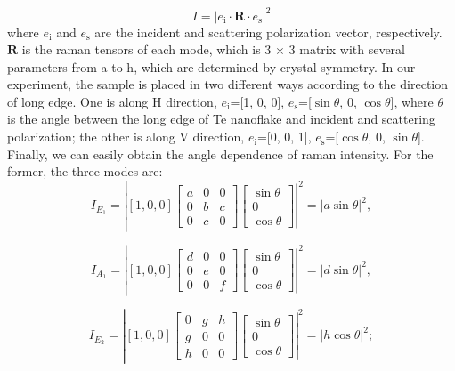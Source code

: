 \documentclass[journal=jacsat,manuscript=article]{achemso}
\begin{document}
\begin{equation}
I = \left|e_{\mathrm{i}} \cdot \mathbf{R} \cdot e_{\mathrm{s}}\right|^{2}
\end{equation}
where $e_{\mathrm{i}}$ and $e_{\mathrm{s}}$ are the incident and scattering polarization vector, respectively. $\mathbf{R}$ is the raman tensors of each mode\cite{tong2020stable}, which is 3 $\times$ 3 matrix with several parameters from a to h, which are determined by crystal symmetry\cite{pine1971raman}. In our experiment, the sample is placed in two different ways according to the direction of long edge. One is along H direction,  $e_{\mathrm{i}}$=[1, 0, 0], $e_{\mathrm{s}}$=[$\sin \theta$, 0, $\cos \theta$], where $\theta$ is the angle between the long edge of Te nanoflake and incident and scattering polarization; the other is along V direction, $e_{\mathrm{i}}$=[0, 0, 1], $e_{\mathrm{s}}$=[$\cos \theta$, 0, $\sin \theta$]. Finally, we can easily obtain the angle dependence of raman intensity. For the former, the three modes are:
\begin{equation}
I_{E_{1}} = \left|\left.[1, 0, 0]\left[\begin{array}{ccc}
a & 0 & 0 \\
0 & b & c \\
0 & c & 0
\end{array}\right]\left[\begin{array}{c}
\sin \theta \\
0 \\
\cos \theta
\end{array}\right]\right|^{2} = \left|a \sin \theta\right|^{2},\right.
\end{equation}

\begin{equation}
I_{A_{1}} = \left|\left.[1, 0, 0]\left[\begin{array}{ccc}
d & 0 & 0 \\
0 & e & 0 \\
0 & 0 & f
\end{array}\right]\left[\begin{array}{c}
\sin \theta \\
0 \\
\cos \theta
\end{array}\right]\right|^{2} = \left|d \sin \theta\right|^{2},\right.
\end{equation}

\begin{equation}
I_{E_{2}} = \left|\left.[1, 0, 0]\left[\begin{array}{ccc}
0 & g & h \\
g & 0 & 0 \\
h & 0 & 0
\end{array}\right]\left[\begin{array}{c}
\sin \theta \\
0 \\
\cos \theta
\end{array}\right]\right|^{2} = \left|h \cos \theta\right|^{2};\right.
\end{equation}
\end{document}
